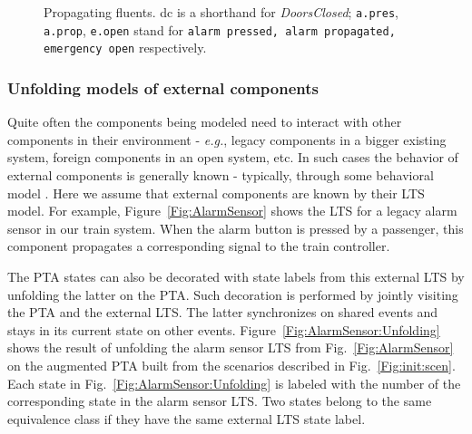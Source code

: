\begin{figure}[H]
\centering
{}
\caption{Propagating fluents\label{Fig:fluents}. {\small dc is a shorthand for \emph{DoorsClosed}; \texttt{a.pres}, \texttt{a.prop}, \texttt{e.open} stand for \texttt{alarm pressed, alarm propagated, emergency open} respectively}.}
\end{figure}

\subsubsection*{Unfolding models of external components}

Quite often the components being modeled need to interact with other components in their environment - \textit{e.g.}, legacy components in a bigger existing system, foreign components in an open system, etc. In such cases the behavior of external components is generally known - typically, through some behavioral model \cite{Hall:2004}. Here we assume that external components are known by their LTS model. For example, Figure~\ref{Fig:AlarmSensor} shows the LTS for a legacy alarm sensor in our train system. When the alarm button is pressed by a passenger, this component propagates a corresponding signal to the train controller. 

The PTA states can also be decorated with state labels from this external LTS by unfolding the latter on the PTA. Such decoration is performed by jointly visiting the PTA and the external LTS. The latter synchronizes on shared events and stays in its current state on other events. Figure~\ref{Fig:AlarmSensor:Unfolding} shows the result of unfolding the alarm sensor LTS from Fig.~\ref{Fig:AlarmSensor} on the augmented PTA built from the scenarios described in Fig.~\ref{Fig:init:scen}. Each state in Fig.~\ref{Fig:AlarmSensor:Unfolding} is labeled with the number of the corresponding state in the alarm sensor LTS. Two states belong to the same equivalence class if they have the same external LTS state label.

